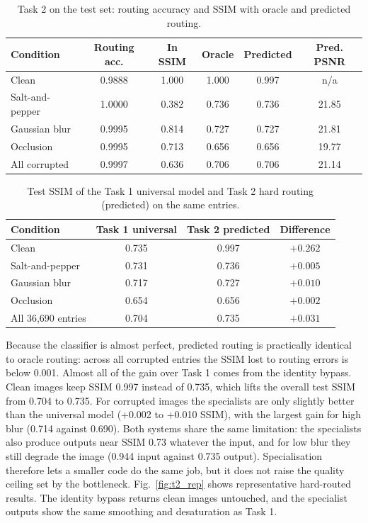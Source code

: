 \documentclass[conference]{IEEEtran}
\begin{document}
\begin{table}[t]
\centering
\caption{Task 2 on the test set: routing accuracy and SSIM with oracle and predicted routing.}
\label{tab:t2_routing}
\footnotesize
\setlength{\tabcolsep}{4pt}
\begin{tabular}{@{}lccccc@{}}
\toprule
Condition & Routing acc. & In SSIM & Oracle & Predicted & Pred. PSNR \\
\midrule
Clean & 0.9888 & 1.000 & 1.000 & 0.997 & n/a \\
Salt-and-pepper & 1.0000 & 0.382 & 0.736 & 0.736 & 21.85 \\
Gaussian blur & 0.9995 & 0.814 & 0.727 & 0.727 & 21.81 \\
Occlusion & 0.9995 & 0.713 & 0.656 & 0.656 & 19.77 \\
\midrule
All corrupted & 0.9997 & 0.636 & 0.706 & 0.706 & 21.14 \\
\bottomrule
\end{tabular}
\end{table}

\begin{table}[t]
\centering
\caption{Test SSIM of the Task 1 universal model and Task 2 hard routing (predicted) on the same entries.}
\label{tab:t2_vs_t1}
\footnotesize
\begin{tabular}{@{}lccc@{}}
\toprule
Condition & Task 1 universal & Task 2 predicted & Difference \\
\midrule
Clean & 0.735 & 0.997 & $+0.262$ \\
Salt-and-pepper & 0.731 & 0.736 & $+0.005$ \\
Gaussian blur & 0.717 & 0.727 & $+0.010$ \\
Occlusion & 0.654 & 0.656 & $+0.002$ \\
\midrule
All 36,690 entries & 0.704 & 0.735 & $+0.031$ \\
\bottomrule
\end{tabular}
\end{table}

Because the classifier is almost perfect, predicted routing is practically identical to oracle routing: across all corrupted entries the SSIM lost to routing errors is below 0.001. Almost all of the gain over Task 1 comes from the identity bypass. Clean images keep SSIM 0.997 instead of 0.735, which lifts the overall test SSIM from 0.704 to 0.735. For corrupted images the specialists are only slightly better than the universal model (+0.002 to +0.010 SSIM), with the largest gain for high blur (0.714 against 0.690). Both systems share the same limitation: the specialists also produce outputs near SSIM 0.73 whatever the input, and for low blur they still degrade the image (0.944 input against 0.735 output). Specialisation therefore lets a smaller code do the same job, but it does not raise the quality ceiling set by the bottleneck. Fig.~\ref{fig:t2_rep} shows representative hard-routed results. The identity bypass returns clean images untouched, and the specialist outputs show the same smoothing and desaturation as Task 1.
\end{document}
